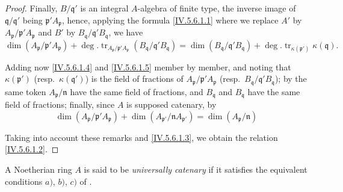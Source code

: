 \begin{proof}
Finally, $B/\mathfrak{q}'$ is an integral $A$-algebra of finite type, the inverse image of $\mathfrak{q}/\mathfrak{q}'$ being $\mathfrak{p}'A_\mathfrak{p}$, hence, applying the formula \eqref{IV.5.6.1.1} where we replace $A'$ by $A_\mathfrak{p}/\mathfrak{p}'A_\mathfrak{p}$ and $B'$ by $B_\mathfrak{q}/\mathfrak{q}'B_\mathfrak{q}$, we have
\[
\tag{5.6.1.5}\label{IV.5.6.1.5}
  \dim(A_\mathfrak{p}/\mathfrak{p}'A_\mathfrak{p}) + \deg.\operatorname{tr}_{A_\mathfrak{p}/\mathfrak{p}'A_\mathfrak{p}}(B_\mathfrak{q}/\mathfrak{q}'B_\mathfrak{q}) = \dim(B_\mathfrak{q}/\mathfrak{q}'B_\mathfrak{q}) + \deg.\operatorname{tr}_{\kappa(\mathfrak{p}')}\kappa(\mathfrak{q}).
\]

Adding now \eqref{IV.5.6.1.4} and \eqref{IV.5.6.1.5} member by member, and noting that $\kappa(\mathfrak{p}')$ (resp.\ $\kappa(\mathfrak{q}')$) is the field of fractions of $A_\mathfrak{p}/\mathfrak{p}'A_\mathfrak{p}$ (resp.\ $B_\mathfrak{q}/\mathfrak{q}'B_\mathfrak{q}$); by the same token $A_\mathfrak{p}/\mathfrak{n}$ have the same field of fractions, and $B_\mathfrak{q}$ and $B_\mathfrak{q}$ have the same field of fractions; finally, since $A$ is supposed catenary, by 
\[
  \dim(A_\mathfrak{p}/\mathfrak{p}'A_\mathfrak{p}) + \dim(A_{\mathfrak{p}'}/\mathfrak{n}A_{\mathfrak{p}'}) = \dim(A_\mathfrak{p}/\mathfrak{n})
\]

Taking into account these remarks and \eqref{IV.5.6.1.3}, we obtain the relation \eqref{IV.5.6.1.2}.
\end{proof}

\begin{definition}[5.6.2]
\label{IV.5.6.2}
A Noetherian ring $A$ is said to be \emph{universally catenary} if it satisfies the equivalent conditions $a)$, $b)$, $c)$ of .
\end{definition}

